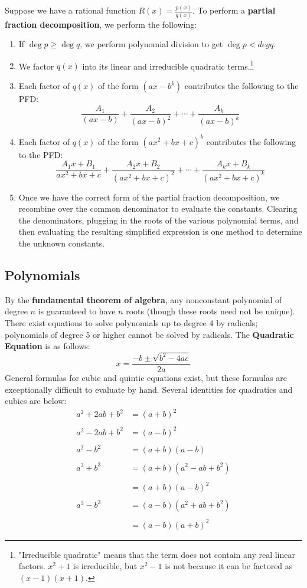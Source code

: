 	Suppose we have a rational function $R(x) = \frac{p(x)}{q(x)}$. To perform a \textbf{partial fraction decomposition}, we perform the following: \begin{enumerate}
		\item If $\deg p \geq \deg q$, we perform polynomial division to get $\deg p < deg q$.
		\item We factor $q(x)$ into its linear and irreducible quadratic terms.\footnote{"Irreducible quadratic" means that the term does not contain any real linear factors. $x^2+1$ is irreducible, but $x^2-1$ is not because it can be factored as $(x-1)(x+1)$.}
		\item Each factor of $q(x)$ of the form $(ax-b^k)$ contributes the following to the PFD: $$\frac{A_1}{(ax-b)} + \frac{A_2}{(ax-b)^2} + \cdots + \frac{A_k}{(ax-b)^k}$$
		\item Each factor of $q(x)$ of the form $(ax^2 + bx + c)^k$ contributes the following to the PFD: $$\frac{A_1x + B_1}{ax^2+bx+c} + \frac{A_2x + B_2}{(ax^2+bx+c)^2} + \cdots + \frac{A_kx + B_k}{(ax^2+bx+c)^k}$$
		\item Once we have the correct form of the partial fraction decomposition, we recombine over the common denominator to evaluate the constants. Clearing the denominators, plugging in the roots of the various polynomial terms, and then evaluating the resulting simplified expression is one method to determine the unknown constants.
	\end{enumerate}

	\subsection{Polynomials}

	By the \textbf{fundamental theorem of algebra}, any nonconstant polynomial of degree $n$ is guaranteed to have $n$ roots (though these roots need not be unique). There exist equations to solve polynomials up to degree 4 by radicals; polynomials of degree 5 or higher cannot be solved by radicals. The \textbf{Quadratic Equation} is as follows: $$x = \displaystyle{\frac{-b\pm \sqrt{b^{2}-4ac}}{2a}}$$ General formulas for cubic and quintic equations exist, but these formulas are exceptionally difficult to evaluate by hand. Several identities for quadratics and cubics are below: $$\begin{array}{rl}
		a^2 + 2ab + b^2&= (a+b)^2\\\\
		a^2 - 2ab + b^2&= (a-b)^2\\\\
		a^2 - b^2&= (a+b)(a-b)\\\\
		a^3 + b^3&= (a+b)(a^2 - ab + b^2)\\\\
		&= (a+b)(a-b)^2\\\\
		a^3 - b^3&= (a-b)(a^2 + ab + b^2)\\\\
		&= (a-b)(a+b)^2
	\end{array}$$

